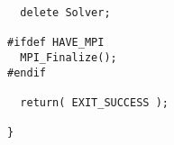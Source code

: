 \documentclass[11pt]{SANDreport}
\begin{document}
\begin{verbatim}  
  delete Solver;
    
#ifdef HAVE_MPI
  MPI_Finalize();
#endif

  return( EXIT_SUCCESS );

}
\end{verbatim}



\end{document}
